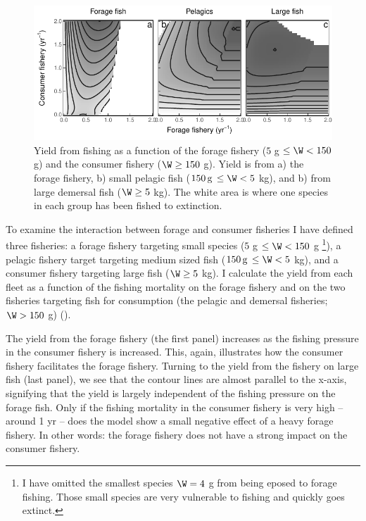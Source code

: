 \begin{figure}[t]
  \centering
  \includegraphics{ChapterCommunityFishing/ForageFishing.pdf}
  \caption{Yield from fishing as a function of the forage fishery ($5$ g $\le \W < 150$ g) and the consumer fishery ($\W \ge 150$ g).  Yield is from a) the forage fishery, b) small pelagic fish ($150\, \mathrm{g}\, \le \W < 5$ kg), and b) from large demersal fish ($\W \ge 5$ kg). The white area is where one species in each group has been fished to extinction.}
  \label{fig:foragefishing}
\end{figure}

To examine the interaction between forage and consumer fisheries I have defined three fisheries: a forage fishery targeting small species ($5$ g $\le \W < 150$ g \footnote{I have omitted the smallest species $\W=4$ g from being eposed to forage fishing. Those small species are very vulnerable to fishing and quickly goes extinct.}), a pelagic fishery target targeting medium sized fish ($150\, \mathrm{g}\, \le \W < 5$ kg), and a consumer fishery targeting large fish ($\W \ge 5$ kg).  I calculate the yield from each fleet as a function of the fishing mortality on the forage fishery and on the two fisheries targeting fish for consumption (the pelagic and demersal fisheries; $\W > 150$ g) ().  

The yield from the forage fishery (the first panel) increases as the fishing pressure in the consumer fishery is increased.  This, again, illustrates how the consumer fishery facilitates the forage fishery.  Turning to the yield from the fishery on large fish (last panel), we see that the contour lines are almost parallel to the x-axis, signifying that the yield is largely independent of the fishing pressure on the forage fish.  Only if the fishing mortality in the consumer fishery is very high -- around 1 yr{\per} -- does the model show a small negative effect of a heavy forage fishery.  In other words: the forage fishery does not have a strong impact on the consumer fishery. 

